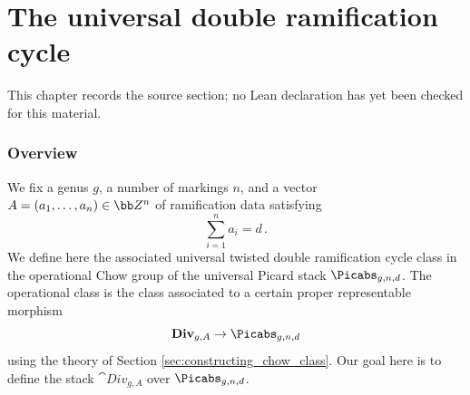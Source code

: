 \chapter{The universal double ramification cycle}
\label{pixtons-formula-abel-jacobi-picard-stack-chapter-04}

\begin{remark}
\label{pixtons-formula-abel-jacobi-picard-stack-chapter-04-source}
This chapter records the source section; no Lean declaration has yet been checked for this material.
\notready
\end{remark}

\label{sec:uni_DR_defs}
\subsection{Overview}
We fix a genus $g$, a number of markings $n$, and a vector $A=(a_1,\ldots,a_n) \in \bb Z^n$
of ramification data satisfying
$$\sum_{i=1}^{n}a_i=d\, .$$
We define here
the associated universal twisted double ramification cycle class
in the operational Chow group of the universal Picard stack $\Picabs_{g,n,d}$.
The operational class is the class associated to a certain proper
representable
morphism
$$\cat{Div}_{g,A} \to \Picabs_{g,n,d}$$
using the theory of Section \ref{sec:constructing_chow_class}.
Our goal here is to define the stack $\cat{Div}_{g,A}$ over $\Picabs_{g,n,d}$.


